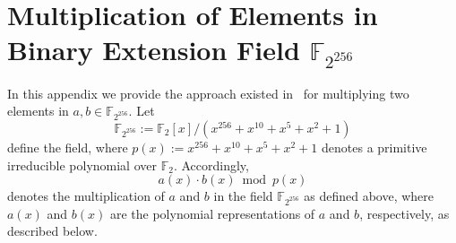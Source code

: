 \chapter{Multiplication of Elements in Binary Extension Field  $\mathbb{F}_{2^{256}}$}\label{a_ch:ff_mult}

In this appendix we provide the approach existed in~\cite{libff} for multiplying two elements in $a,b \in \mathbb{F}_{2^{256}}$. Let
\begin{equation}\label{eq_F_2_192}
	\mathbb{F}_{2^{256}} := \mathbb{F}_{2}[x]/(x^{256} + x^{10} + x^{5} + x^{2} + 1)
\end{equation}%
	define the field, where $p(x):=x^{256} + x^{10} + x^{5} + x^{2} + 1$ denotes a primitive irreducible polynomial  over $\mathbb{F}_{2}$.  Accordingly, 
	\[
	a(x) \cdot b(x) \bmod p(x)
	\]
	denotes the multiplication of $a$ and $b$ in the field $\mathbb{F}_{2^{256}}$ as defined above, where $a(x)$ and $b(x)$ are the polynomial representations of $a$ and $b$, respectively, as described below.

